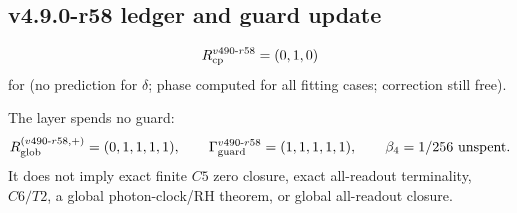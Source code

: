 \subsection*{v4.9.0-r58 ledger and guard update}
\label{subsec:v490-r58-ledger-guard}

\[
R_{\rm cp}^{v490\text{-}r58}=(0,1,0)
\]
for (no prediction for \(\delta\); phase computed for all fitting cases; correction still free).

The layer spends no guard:
\[
R_{\rm glob}^{(v490\text{-}r58,+)}=(0,1,1,1,1),
\qquad
\Gamma_{\rm guard}^{v490\text{-}r58}=(1,1,1,1,1),
\qquad
\beta_4=1/256\ \text{unspent}.
\]
It does not imply exact finite \(C5\) zero closure, exact all-readout terminality,
\(C6/T2\), a global photon-clock/RH theorem, or global all-readout closure.
